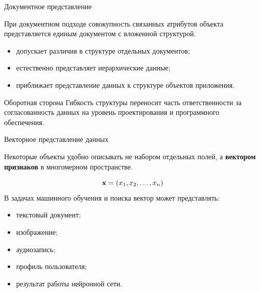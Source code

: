 \documentclass[aspectratio=169]{beamer}
\begin{document}
\begin{frame}{Документное представление}

При документном подходе совокупность связанных атрибутов
объекта представляется единым документом с вложенной
структурой.

\vspace{0.3cm}

\begin{itemize}
  \item допускает различия в структуре отдельных документов;
  \item естественно представляет иерархические данные;
  \item приближает представление данных к структуре
        объектов приложения.
\end{itemize}

\vspace{0.3cm}

\begin{alertblock}{Оборотная сторона}
Гибкость структуры переносит часть ответственности
за согласованность данных на уровень проектирования
и программного обеспечения.
\end{alertblock}

\end{frame}


\begin{frame}{Векторное представление данных}

Некоторые объекты удобно описывать не набором отдельных полей, а \textbf{вектором признаков} в многомерном пространстве.

\[\Large
\mathbf{x} =
(x_1,x_2,\ldots,x_n)
\]
\normalsize
В задачах машинного обучения и поиска вектор может представлять:

\begin{itemize}

    \item текстовый документ;

    \item изображение;

    \item аудиозапись;

    \item профиль пользователя;

    \item результат работы нейронной сети.

\end{itemize}

\end{frame}
\end{document}
